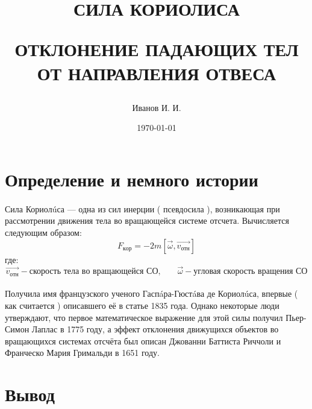 \documentclass[a4paper, 12pt]{article}
\title{ \begin{center}СИЛА КОРИОЛИСА\end{center}
ОТКЛОНЕНИЕ ПАДАЮЩИХ ТЕЛ ОТ НАПРАВЛЕНИЯ ОТВЕСА}
\author{Иванов И. И.}
\date{\today}
\begin{document}
\maketitle
\newpage
\section{Определение и немного истории}
\paragraph{}
Сила Кориол\'uса — одна из сил инерции ( псевдосила ), возникающая при рассмотрении движения тела во вращающейся системе отсчета. Вычисляется следующим образом: 
\[ F_{кор} = -2m[\overrightarrow{\omega}, \overrightarrow{v_{отн}}]\]
где:
\[ \overrightarrow{v_{отн}} - \text{скорость тела во вращающейся СО,} \qquad \overrightarrow{\omega} - \text{угловая скорость вращения СО}\]
\paragraph{}
Получила имя французского ученого Гасп\'aра-Гюст\'aва де Кориол\'uса, впервые ( как считается ) описавшего её в статье 1835 года. Однако некоторые люди утверждают, что первое математическое выражение для этой силы получил Пьер-Симон Лаплас в 1775 году, а эффект отклонения движущихся объектов во вращающихся системах отсчёта был описан Джованни Баттиста Риччоли и Франческо Мария Гримальди в 1651 году.
\section{Вывод}
\end{document}
